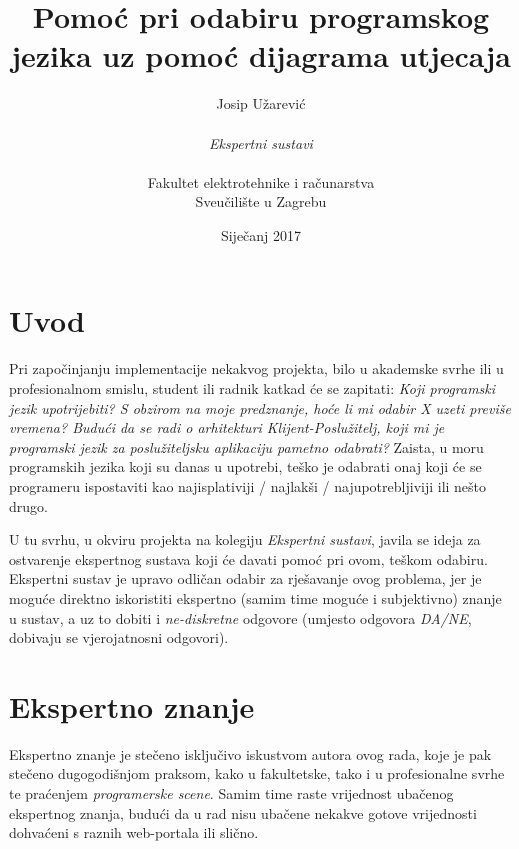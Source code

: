 \documentclass{article}
\begin{document}
	\title{Pomoć pri odabiru programskog jezika uz pomoć dijagrama utjecaja}
	\author{Josip Užarević\\\\
		\textit{Ekspertni sustavi}\\\\
		Fakultet elektrotehnike i računarstva\\
		Sveučilište u Zagrebu}
	\date{Siječanj 2017}
	
	\clearpage\maketitle
	\thispagestyle{empty}
	\pagebreak
	
	\tableofcontents
	\thispagestyle{empty}
	\pagebreak
	\setcounter{page}{1} 
	
	\section{Uvod}
	Pri započinjanju implementacije nekakvog projekta, bilo u akademske svrhe ili u profesionalnom smislu, student ili radnik katkad će se zapitati: \textit{Koji programski jezik upotrijebiti? S obzirom na moje predznanje, hoće li mi odabir X uzeti previše vremena? Budući da se radi o arhitekturi Klijent-Poslužitelj, koji mi je programski jezik za poslužiteljsku aplikaciju pametno odabrati?} Zaista, u moru programskih jezika koji su danas u upotrebi, teško je odabrati onaj koji će se programeru ispostaviti kao najisplativiji / najlakši / najupotrebljiviji ili nešto drugo.
	
	U tu svrhu, u okviru projekta na kolegiju \textit{Ekspertni sustavi}, javila se ideja za ostvarenje ekspertnog sustava koji će davati pomoć pri ovom, teškom odabiru. Ekspertni sustav je upravo odličan odabir za rješavanje ovog problema, jer je moguće direktno iskoristiti ekspertno (samim time moguće i subjektivno) znanje u sustav, a uz to dobiti i \textit{ne-diskretne} odgovore (umjesto odgovora \textit{DA/NE}, dobivaju se vjerojatnosni odgovori).
	
	\section{Ekspertno znanje}
	Ekspertno znanje je stečeno isključivo iskustvom autora ovog rada, koje je pak stečeno dugogodišnjom praksom, kako u fakultetske, tako i u profesionalne svrhe te praćenjem \textit{programerske scene}. Samim time raste vrijednost ubačenog ekspertnog znanja, budući da u rad nisu ubačene nekakve gotove vrijednosti dohvaćeni s raznih web-portala ili slično.
	
\end{document}
